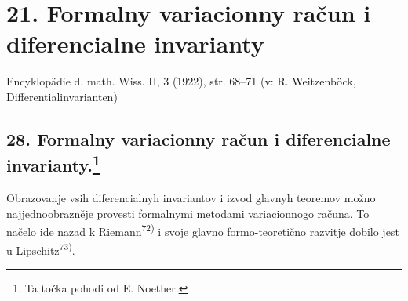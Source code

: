 \documentclass[11pt]{article}
\begin{document}

\section*{21. Formalny variacionny račun i diferencialne invarianty}
\begin{center}
Encyklopädie d. math. Wiss. II, 3 (1922), str. 68--71 (v: R. Weitzenböck, Differentialinvarianten)
\end{center}

\setcounter{footnote}{148}
\subsection*{28. Formalny variacionny račun i diferencialne invarianty.\footnote{Ta točka pohodi od E. Noether.}}

Obrazovanje vsih diferencialnyh invariantov i izvod glavnyh teoremov možno najjednoobrazněje provesti formalnymi metodami variacionnogo računa. To načelo ide nazad k Riemann\textsuperscript{72)} i svoje glavno formo-teoretično razvitje dobilo jest u Lipschitz\textsuperscript{73)}.
\end{document}
